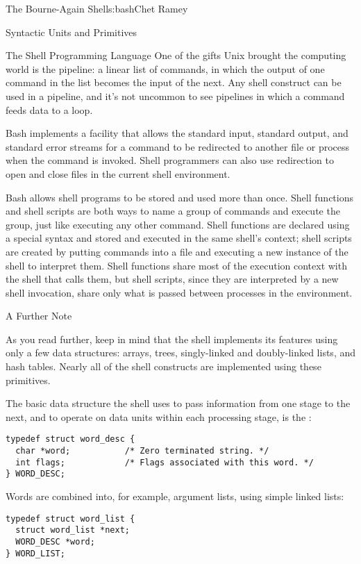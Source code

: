 \begin{aosachapter}{The Bourne-Again Shell}{s:bash}{Chet Ramey}
\begin{aosasect1}{Syntactic Units and Primitives}
\begin{aosasect2}{The Shell Programming Language}
One of the gifts Unix brought the computing world is the pipeline: a
linear list of commands, in which the output of one command in the
list becomes the input of the next.  Any shell construct can be used
in a pipeline, and it's not uncommon to see pipelines in which a
command feeds data to a loop.

Bash implements a facility that allows the standard input, standard
output, and standard error streams for a command to be redirected to
another file or process when the command is invoked.  Shell
programmers can also use redirection to open and close files in the
current shell environment.

Bash allows shell programs to be stored and used more than once.
Shell functions and shell scripts are both ways to name a group of
commands and execute the group, just like executing any other command.
Shell functions are declared using a special syntax and stored and
executed in the same shell's context; shell scripts are created by
putting commands into a file and executing a new instance of the shell
to interpret them.  Shell functions share most of the execution
context with the shell that calls them, but shell scripts, since they
are interpreted by a new shell invocation, share only what is passed
between processes in the environment.

\end{aosasect2}

\begin{aosasect2}{A Further Note}

As you read further, keep in mind that the shell implements its
features using only a few data structures: arrays, trees,
singly-linked and doubly-linked lists, and hash tables.  Nearly all of
the shell constructs are implemented using these primitives.

The basic data structure the shell uses to pass information from one
stage to the next, and to operate on data units within each processing
stage, is the :

\begin{verbatim}
typedef struct word_desc {
  char *word;           /* Zero terminated string. */
  int flags;            /* Flags associated with this word. */
} WORD_DESC;
\end{verbatim}

\noindent Words are combined into, for example, argument lists, using simple
linked lists:

\begin{verbatim}
typedef struct word_list {
  struct word_list *next;
  WORD_DESC *word;
} WORD_LIST;
\end{verbatim}


\end{aosasect2}
\end{aosasect1}
\end{aosachapter}

